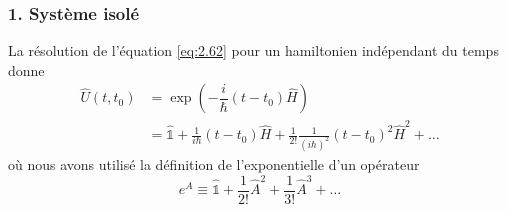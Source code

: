 		\subsubsection{1. Système isolé}
		La résolution de l'équation \autoref{eq:2.62} pour un hamiltonien indépendant du temps donne
		\begin{equation}
		\begin{array}{ll}
		\hat{U}(t,t_0) &= \exp\left(-\dfrac{i}{\hbar}(t-t_0)\hat{H}\right)\\
		&= \hat{\mathbb{1}} + \frac{1}{i\hbar}(t-t_0)\hat{H} + \frac{1}{2!}\frac{1}{(i\hbar)^2}
		(t-t_0)^2\hat{H}^2 + \dots
		\end{array}
		\label{eq:4.17}
		\end{equation}				
		où nous avons utilisé la définition de l'exponentielle d'un opérateur
		\begin{equation}
		e^{\hat{A}} \equiv \hat{\mathbb{1}} + \frac{1}{2!}\hat{A}^2+\frac{1}{3!}\hat{A}^3+\dots
		\end{equation}				
		
